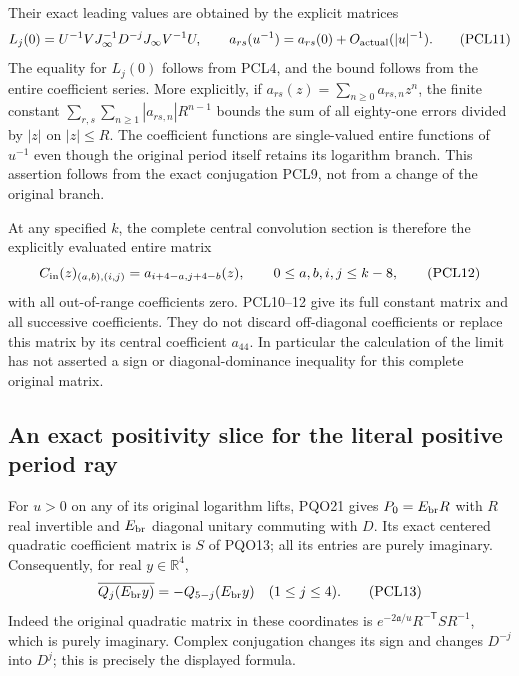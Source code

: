 \documentclass[11pt,a4paper]{article}
\begin{document}
Their exact leading values are obtained by the explicit matrices
\[
 L_j(0)=U^{-1}VJ_\infty^{-1}D^{-j}J_\infty V^{-1}U,
 \qquad a_{rs}(u^{-1})=a_{rs}(0)+O_{\rm actual}(|u|^{-1}).
 \tag{PCL11}
\]
The equality for $L_j(0)$ follows from PCL4, and the bound follows
from the entire coefficient series. More explicitly, if
$a_{rs}(z)=\sum_{n\ge0}a_{rs,n}z^n$, the finite constant
$\sum_{r,s}\sum_{n\ge1}|a_{rs,n}|R^{n-1}$ bounds the sum of
all eighty-one errors divided by $|z|$ on $|z|\le R$.
The coefficient functions are single-valued entire functions of
$u^{-1}$ even though the original period itself retains its
logarithm branch. This assertion follows from the exact conjugation
PCL9, not from a change of the original branch.

At any specified $k$, the complete central convolution section is
therefore the explicitly evaluated entire matrix
\[
 C_{\rm in}(z)_{(a,b),(i,j)}=a_{i+4-a,j+4-b}(z),
 \qquad 0\le a,b,i,j\le k-8,
 \tag{PCL12}
\]
with all out-of-range coefficients zero. PCL10--12 give its full
constant matrix and all successive coefficients. They do not
discard off-diagonal coefficients or replace this matrix by its
central coefficient $a_{44}$. In particular the calculation of
the limit has not asserted a sign or diagonal-dominance inequality
for this complete original matrix.

\subsection{An exact positivity slice for the literal positive period ray}
For $u>0$ on any of its original logarithm lifts, PQO21 gives
$P_0=E_{\rm br}R$ with $R$ real invertible and $E_{\rm br}$ diagonal
unitary commuting with $D$. Its exact centered quadratic coefficient
matrix is $S$ of PQO13; all its entries are purely imaginary.
Consequently, for real $y\in\mathbb R^4$,
\[
 \overline{Q_j(E_{\rm br}y)}=-Q_{5-j}(E_{\rm br}y)
              \quad(1\le j\le4).
 \tag{PCL13}
\]
Indeed the original quadratic matrix in these coordinates is
$e^{-2\mathfrak a/u}R^{-\mathsf T}SR^{-1}$, which is purely
imaginary. Complex conjugation changes its sign and changes
$D^{-j}$ into $D^j$; this is precisely the displayed formula.
\end{document}
